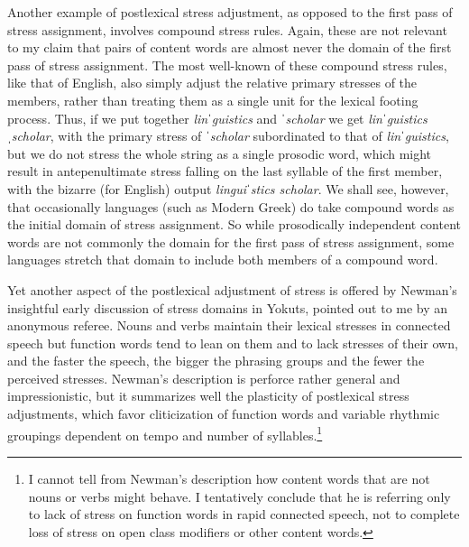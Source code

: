\documentclass[output=paper,
modfonts
]{LSP/langsci}
\begin{document}
Another example of postlexical stress adjustment, as opposed to the first pass of stress assignment, involves compound stress rules. Again, these are not relevant to my claim that pairs of content words are almost never the domain of the first pass of stress assignment. The most well-known of these compound stress rules, like that of English, also simply adjust the relative primary stresses of the members, rather than treating them as a single unit for the lexical footing process. Thus, if we put together \textit{linˈguistics} and \textit{ˈscholar} we get \textit{linˈguistics ˌscholar}, with the primary stress of \textit{ˈscholar} subordinated to that of \textit{linˈguistics}, but we do not stress the whole string as a single prosodic word, which might result in antepenultimate stress falling on the last syllable of the first member, with the bizarre (for English) output \textit{linguiˈstics scholar}. We shall see, however, that occasionally languages (such as Modern Greek) do take compound words as the initial domain of stress assignment. So while prosodically independent content words are not commonly the domain for the first pass of stress assignment, some languages stretch that domain to include both members of a compound word. 

Yet another aspect of the postlexical adjustment of stress is offered by Newman’s \citeyearpar[28--29]{newman1944} insightful early discussion of stress domains in Yokuts, pointed out to me by an anonymous referee. Nouns and verbs maintain their lexical stresses in connected speech but function words tend to lean on them and to lack stresses of their own, and the faster the speech, the bigger the phrasing groups and the fewer the perceived stresses. Newman’s description is perforce rather general and impressionistic, but it summarizes well the plasticity of postlexical stress adjustments, which favor cliticization of function words and variable rhythmic groupings dependent on tempo and number of syllables.\footnote{I cannot tell from Newman’s description how content words that are not nouns or verbs might behave. I tentatively conclude that he is referring only to lack of stress on function words in rapid connected speech, not to complete loss of stress on open class modifiers or other content words.}
\end{document}
